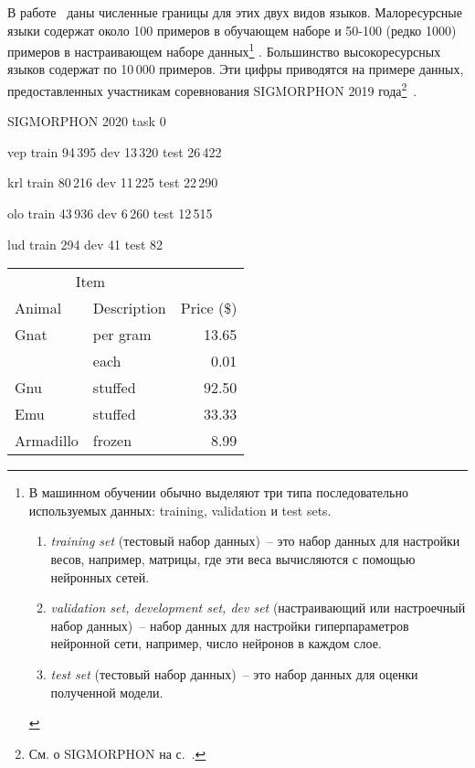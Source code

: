 В работе~\cite{Anastasopoulos2019Pushing_Limits_Low-Resource_MI} 
даны численные границы для этих двух видов языков.
Малоресурсные языки содержат около 100 примеров в обучающем наборе 
и 50-100 (редко 1000) примеров в настраивающем наборе данных\footnote{%
    В машинном обучении обычно выделяют три типа 
    последовательно используемых данных: training, validation и test sets.
    \begin{enumerate}[label=(\roman*)]
        \item \emph{training set} (тестовый набор данных)~-- 
            это набор данных для настройки весов, например, матрицы, 
            где эти веса вычисляются с помощью нейронных сетей.

        \item \emph{validation set, development set, dev set} 
            (настраивающий или настроечный набор данных)~-- 
            набор данных для настройки гиперпараметров нейронной сети, 
            например, число нейронов в каждом слое.

        \item \emph{test set} (тестовый набор данных)~-- это набор данных 
            для оценки полученной модели. 
    \end{enumerate}
    }%
%
. 
Большинство высокоресурсных языков содержат по 10\,000 примеров.
Эти цифры приводятся на примере данных, 
предоставленных участникам соревнования SIGMORPHON 2019 года\footnote{%
    См. о SIGMORPHON на с.~\pageref{SIGMORPHON}.
}~\cite{Anastasopoulos2019Pushing_Limits_Low-Resource_MI}.


SIGMORPHON 2020 task 0

vep  train 94\,395 dev 13\,320 test 26\,422

krl  train 80\,216 dev 11\,225 test 22\,290

olo  train 43\,936 dev 6\,260 test 12\,515

lud  train 294 dev 41 test 82

\begin{tabular}{llr}
\hline
\multicolumn{2}{c}{Item} \\
\cline{1-2}
Animal    & Description & Price (\$) \\
\hline
Gnat      & per gram    & 13.65      \\
          & each        & 0.01       \\
Gnu       & stuffed     & 92.50      \\
Emu       & stuffed     & 33.33      \\
Armadillo & frozen      & 8.99       \\
\hline
\end{tabular}





